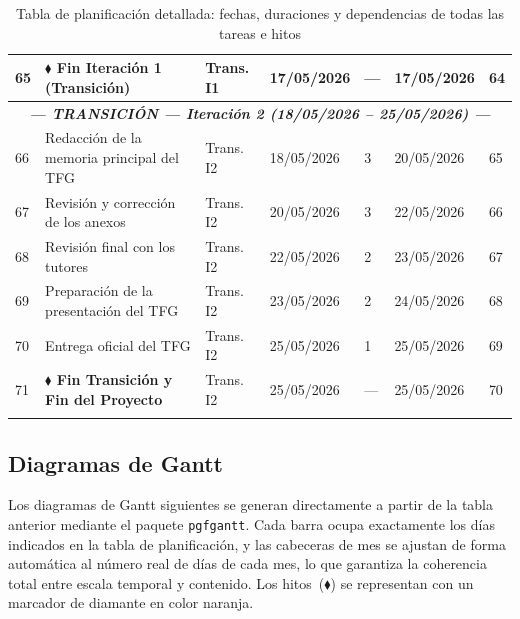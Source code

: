 \documentclass[11pt, a4paper]{article}
\begin{document}
\begin{longtable}{|p{0.6cm}|p{5.2cm}|p{2.5cm}|p{1.9cm}|p{0.9cm}|p{1.9cm}|p{1.4cm}|}
\hline
65 & \textbf{$\blacklozenge$ Fin Iteración 1 (Transición)} & Trans. I1 & 17/05/2026 & --- & 17/05/2026 & 64 \\
\hline
\multicolumn{7}{|c|}{\textit{\textbf{--- TRANSICIÓN --- Iteración 2 (18/05/2026 -- 25/05/2026) ---}}} \\
\hline
66 & Redacción de la memoria principal del TFG & Trans. I2 & 18/05/2026 & 3 & 20/05/2026 & 65 \\
\hline
67 & Revisión y corrección de los anexos & Trans. I2 & 20/05/2026 & 3 & 22/05/2026 & 66 \\
\hline
68 & Revisión final con los tutores & Trans. I2 & 22/05/2026 & 2 & 23/05/2026 & 67 \\
\hline
69 & Preparación de la presentación del TFG & Trans. I2 & 23/05/2026 & 2 & 24/05/2026 & 68 \\
\hline
70 & Entrega oficial del TFG & Trans. I2 & 25/05/2026 & 1 & 25/05/2026 & 69 \\
\hline
71 & \textbf{$\blacklozenge$ Fin Transición y Fin del Proyecto} & Trans. I2 & 25/05/2026 & --- & 25/05/2026 & 70 \\
\hline
\caption{Tabla de planificación detallada: fechas, duraciones y dependencias de todas las tareas e hitos}
\end{longtable}

\subsection{Diagramas de Gantt}

Los diagramas de Gantt siguientes se generan directamente a partir de la tabla anterior mediante el paquete \texttt{pgfgantt}. Cada barra ocupa exactamente los días indicados en la tabla de planificación, y las cabeceras de mes se ajustan de forma automática al número real de días de cada mes, lo que garantiza la coherencia total entre escala temporal y contenido. Los hitos~($\blacklozenge$) se representan con un marcador de diamante en color naranja.

\end{document}
